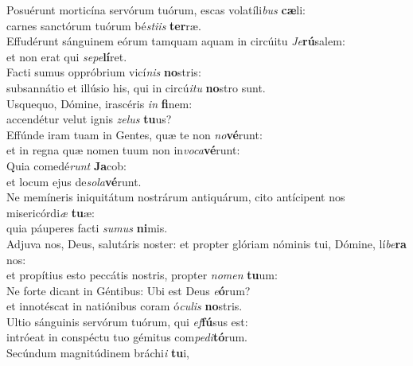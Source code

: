 \evenverse Posuérunt morticína servórum tuórum, escas volatíli\textit{bus} \textbf{cæ}li:~\*\\
\evenverse carnes sanctórum tuórum bé\textit{sti}\textit{is} \textbf{ter}ræ.\\
\oddverse Effudérunt sánguinem eórum tamquam aquam in circúitu \textit{Je}\textbf{rú}salem:~\*\\
\oddverse et non erat qui \textit{se}\textit{pe}\textbf{lí}ret.\\
\evenverse Facti sumus oppróbrium vicí\textit{nis} \textbf{no}stris:~\*\\
\evenverse subsannátio et illúsio his, qui in circú\textit{i}\textit{tu} \textbf{no}stro sunt.\\
\oddverse Usquequo, Dómine, irascéris \textit{in} \textbf{fi}nem:~\*\\
\oddverse accendétur velut ignis \textit{ze}\textit{lus} \textbf{tu}us?\\
\evenverse Effúnde iram tuam in Gentes, quæ te non \textit{no}\textbf{vé}runt:~\*\\
\evenverse et in regna quæ nomen tuum non in\textit{vo}\textit{ca}\textbf{vé}runt:\\
\oddverse Quia comedé\textit{runt} \textbf{Ja}cob:~\*\\
\oddverse et locum ejus de\textit{so}\textit{la}\textbf{vé}runt.\\
\evenverse Ne memíneris iniquitátum nostrárum antiquárum, cito antícipent nos misericórdi\textit{æ} \textbf{tu}æ:~\*\\
\evenverse quia páuperes facti \textit{su}\textit{mus} \textbf{ni}mis.\\
\oddverse Adjuva nos, Deus, salutáris noster: et propter glóriam nóminis tui, Dómine, lí\textit{be}\textbf{ra} nos:~\*\\
\oddverse et propítius esto peccátis nostris, propter \textit{no}\textit{men} \textbf{tu}um:\\
\evenverse Ne forte dicant in Géntibus: Ubi est Deus \textit{e}\textbf{ó}rum?~\*\\
\evenverse et innotéscat in natiónibus coram ó\textit{cu}\textit{lis} \textbf{no}stris.\\
\oddverse Ultio sánguinis servórum tuórum, qui \textit{ef}\textbf{fú}sus est:~\*\\
\oddverse intróeat in conspéctu tuo gémitus com\textit{pe}\textit{di}\textbf{tó}rum.\\
\evenverse Secúndum magnitúdinem bráchi\textit{i} \textbf{tu}i,~\*\\
